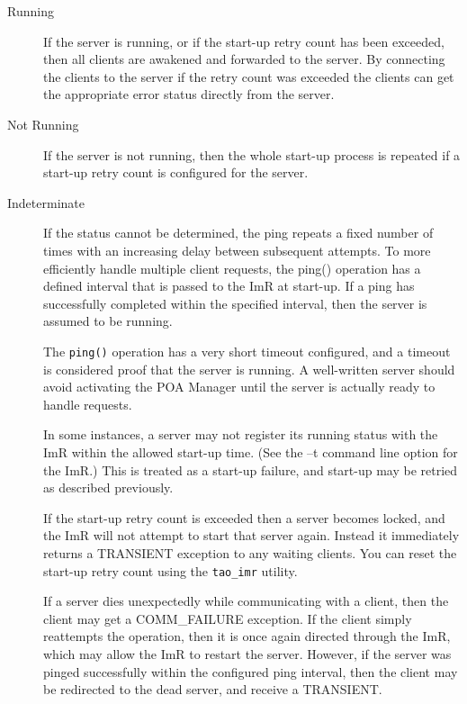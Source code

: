 \begin{description}
      \item [Running]
                If the server is running, or if the start-up retry count has been exceeded,
                then all clients are awakened and forwarded to the server. By connecting
              the clients to the server if the retry count was exceeded the clients can get
              the appropriate error status directly from the server.
     \item [Not Running]
               If the server is not running, then the whole start-up process is repeated
               if a start-up retry count is configured for the server.
     \item [Indeterminate]
               If the status cannot be determined, the ping repeats a fixed number of
               times with an increasing delay between subsequent attempts.  To more
               efficiently handle multiple client requests, the ping() operation has a
               defined interval that is passed to the ImR at start-up. If a ping has
               successfully completed within the specified interval, then the server is
               assumed to be running.

               The {\tt ping()} operation has a very short timeout configured, and a timeout
               is considered proof that the server is running. A well-written server should
               avoid activating the POA Manager until the server is actually ready to handle
               requests.

               In some instances, a server may not register its running status with the ImR
               within the allowed start-up time. (See the –t command line option for the ImR.)
               This is treated as a start-up failure, and start-up may be retried as described
               previously.

               If the start-up retry count is exceeded then a server becomes locked, and the
               ImR will not attempt to start that server again. Instead it immediately returns
               a TRANSIENT exception to any waiting clients. You can reset the start-up
               retry count using the {\tt tao\_imr} utility.

               If a server dies unexpectedly while communicating with a client, then the client
               may get a COMM\_FAILURE exception. If the client simply reattempts the
               operation, then it is once again directed through the ImR, which may allow the
               ImR to restart the server. However, if the server was pinged successfully within
               the configured ping interval, then the client may be redirected to the dead server,
               and receive a TRANSIENT.
\end{description}


